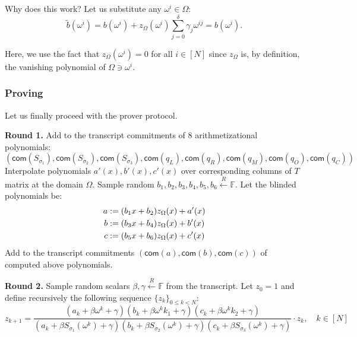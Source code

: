 \documentclass[../lecture-notes.tex]{subfiles}
\begin{document}
Why does this work? Let us substitute any $\omega^i \in \Omega$:
\begin{equation*}
    \widetilde{b}(\omega^i) = b(\omega^i) + z_{\Omega}(\omega^i)\sum_{j=0}^{\delta}\gamma_j\omega^{ij} = b(\omega^i).
\end{equation*}

Here, we use the fact that $z_{\Omega}(\omega^i) = 0$ for all $i \in [N]$ since $z_{\Omega}$ is, 
by definition, the vanishing polynomial of $\Omega \ni \omega^i$.

\subsubsection{Proving}
Let us finally proceed with the prover protocol.

\textcolor{green!60!black}{\textbf{Round 1.}} Add to the transcript commitments
of 8 arithmetizational polynomials:
\begin{equation*}
    (\mathsf{com}(S_{\sigma_1}), \mathsf{com}(S_{\sigma_2}), \mathsf{com}(S_{\sigma_3}), \mathsf{com}(q_L), \mathsf{com}(q_R), \mathsf{com}(q_M), \mathsf{com}(q_O), \mathsf{com}(q_C))
\end{equation*}
Interpolate polynomials $a'(x), b'(x), c'(x)$ over corresponding columns of $T$ matrix at
the domain $\Omega$. Sample random $b_1, b_2, b_3, b_4, b_5, b_6 \xleftarrow{R}
\mathbb{F}$. Let the blinded polynomials be:
\begin{align*}
\centering
a &:= (b_1 x + b_2)z_{\Omega}(x) + a'(x) \\
b &:= (b_3 x + b_4)z_{\Omega}(x) + b'(x) \\
c &:= (b_5 x + b_6)z_{\Omega}(x) + c'(x)
\end{align*}
Add to the transcript commitments $(\mathsf{com}(a), \mathsf{com}(b),
\mathsf{com}(c))$ of computed above polynomials.

\textcolor{green!60!black}{\textbf{Round 2.}}  Sample random scalars $\beta,
\gamma \xleftarrow{R} \mathbb{F}$ from the transcript. Let $z_0 = 1$ and define
recursively the following sequence $\{z_k\}_{0 \leq k < N}$:
\begin{equation*}
    z_{k+1} = \frac{(a_k + \beta \omega^{k} + \gamma) (b_k + \beta \omega^{k}k_1 + \gamma) (c_k + \beta \omega^{k}k_2 + \gamma)}{(a_k + \beta S_{\sigma_1}(\omega^{k}) + \gamma) (b_k + \beta S_{\sigma_2}(\omega^{k}) + \gamma) (c_k + \beta S_{\sigma_3}(\omega^{k}) + \gamma)} \cdot z_k, \quad k \in [N]
\end{equation*}
\end{document}
